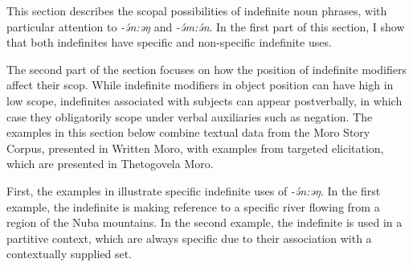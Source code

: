 This section describes the scopal possibilities of indefinite noun phrases, with particular attention to \textit{-ə́n:əŋ} and \textit{-ə́m:ə́n}. In the first part of this section, I show that both indefinites have specific and non-specific indefinite uses.

The second part of the section focuses on how the position of indefinite modifiers affect their scop. While indefinite modifiers in object position can have high in low scope, indefinites associated with subjects can appear postverbally, in which case they obligatorily scope under verbal auxiliaries such as negation. The examples in this section below combine textual data from the Moro Story Corpus, presented in Written Moro, with examples from targeted elicitation, which are presented in Thetogovela Moro. 

First, the examples in  illustrate specific indefinite uses of \textit{-ə́n:əŋ}. In the first example, the indefinite is making reference to a specific river flowing from a region of the Nuba mountains. In the second example, the indefinite is used in a partitive context, which are always specific due to their association with a contextually supplied set.

